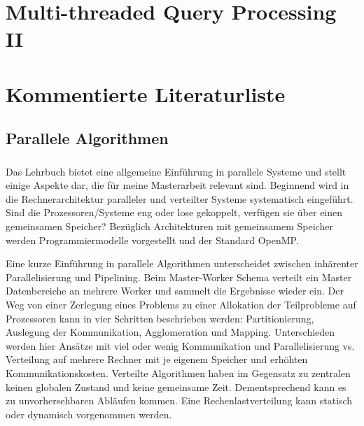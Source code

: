 \documentclass[a4paper,12pt,twoside]{article}
\begin{document}
\section*{Multi-threaded Query Processing II}

\section{Kommentierte Literaturliste}

\subsection{Parallele Algorithmen}

\subsubsection*{}

Das Lehrbuch bietet eine allgemeine Einführung in parallele Systeme und stellt einige Aspekte dar, die für meine Masterarbeit relevant sind.  Beginnend wird in die Rechnerarchitektur paralleler und verteilter Systeme systematisch eingeführt. Sind die Prozessoren/Systeme eng oder lose gekoppelt, verfügen sie über einen gemeinsamen Speicher? Bezüglich Architekturen mit gemeinsamem Speicher werden Programmiermodelle vorgestellt und der Standard OpenMP.

Eine kurze Einführung in parallele Algorithmen unterscheidet zwischen inhärenter Parallelisierung und Pipelining. Beim Master-Worker Schema verteilt ein Master Datenbereiche an mehrere Worker und sammelt die Ergebnisse wieder ein. Der Weg von einer Zerlegung eines Problems zu einer Allokation der Teilprobleme auf Prozessoren kann in vier Schritten beschrieben werden: Partitionierung, Auslegung der Kommunikation, Agglomeration und Mapping. Unterschieden werden hier Ansätze mit viel oder wenig Kommunikation und Parallelisierung vs. Verteilung auf mehrere Rechner mit je eigenem Speicher und erhöhten Kommunikationskosten. Verteilte Algorithmen haben im Gegensatz zu zentralen keinen globalen Zustand und keine gemeinsame Zeit. Dementsprechend kann es zu unvorhersehbaren Abläufen kommen. Eine Rechenlastverteilung kann statisch oder dynamisch vorgenommen werden. 

\subsubsection*{}
\end{document}

